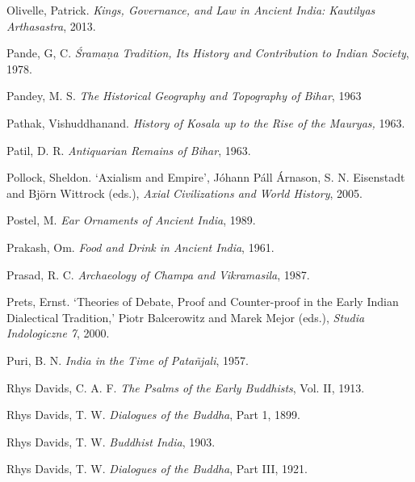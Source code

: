 \label{footprints_split_022.html_Olivelleux202013}
Olivelle, Patrick. \emph{Kings, Governance, and Law in Ancient India:
Kautilya\textquotesingle s Arthasastra}, 2013.

Pande, G, C. \emph{Śramaṇa Tradition, Its History and Contribution to
Indian Society}, 1978.

\label{footprints_split_022.html_Pandeyux201963}
Pandey, M. S. \emph{The Historical Geography and Topography of Bihar},
1963

\label{footprints_split_022.html_Pathakux201963}
Pathak, Vishuddhanand. \emph{History of Kosala up to the Rise of the
Mauryas,} 1963.

\label{footprints_split_022.html_Patilux201963}
Patil, D. R. \emph{Antiquarian Remains of Bihar}, 1963.

\label{footprints_split_022.html_Pollockux202005}
Pollock, Sheldon. `Axialism and Empire', Jóhann Páll Árnason, S. N.
Eisenstadt and Björn Wittrock (eds.), \emph{Axial Civilizations and
World History}, 2005.

\label{footprints_split_022.html_Postelux201989}
Postel, M. \emph{Ear Ornaments of Ancient India}, 1989.

\label{footprints_split_022.html_Prakashux201961}
Prakash, Om. \emph{Food and Drink in Ancient India}, 1961.

Prasad, R. C. \emph{Archaeology of Champa and} \emph{Vikramasila}, 1987.

\label{footprints_split_022.html_Pretsux202000}
Prets, Ernst. `Theories of Debate, Proof and Counter-proof in the Early
Indian Dialectical Tradition,' Piotr Balcerowitz and Marek Mejor (eds.),
\emph{Studia Indologiczne 7}, 2000.

Puri, B. N. \emph{India in the Time of Patañjali}, 1957.

\label{footprints_split_022.html_Rhysux20Davidsux20CAFux201913}
Rhys Davids, C. A. F. \emph{The Psalms of the Early Buddhists}, Vol. II,
1913.

\label{footprints_split_022.html_Davidsux20TWux201899}
Rhys Davids, T. W. \emph{Dialogues of the Buddha}, Part 1, 1899.

\label{footprints_split_022.html_Rhysux20Davidsux20TWux201903}
Rhys Davids, T. W. \emph{Buddhist India}, 1903.

\label{footprints_split_022.html_Rhysux20Davidsux20TWux201921}
Rhys Davids, T. W. \emph{Dialogues of the Buddha}, Part III, 1921.


